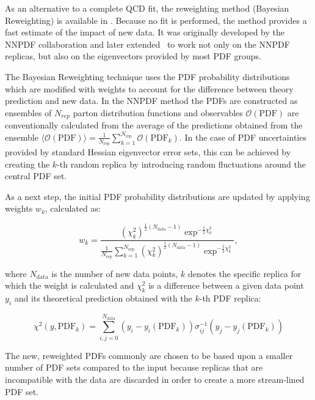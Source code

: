 As an alternative to a complete QCD fit, the reweighting method (Bayesian Reweighting) is available in \fitter.
Because no fit is performed, the method provides a fast estimate of the impact of new data. 
It was originally developed by the NNPDF collaboration \cite{Ball:2011gg,Ball:2010gb} and later extended~\cite{Watt:2012tq} 
to work not only on the NNPDF replicas, but also on the eigenvectors provided by most PDF groups. 

The Bayesian Reweighting technique uses the PDF probability distributions which are modified with weights 
to account for the difference between theory prediction and new data.
In the NNPDF method the PDFs are constructed as ensembles of $N_{rep}$ parton 
distribution functions and observables $\mathcal{O}(\mathrm{PDF})$ are conventionally calculated from the average
of the predictions obtained from the ensemble 
$\langle\mathcal{O}(\mathrm{PDF})\rangle =  \frac{1}{N_{\mathrm{rep}}} \sum_{k=1}^{N_{\mathrm{rep}}} \mathcal{O}(\mathrm{PDF}_k)$.
In the case of PDF uncertainties provided by standard Hessian eigenvector error sets, this can be achieved 
by creating the $k$-th random replica by introducing random fluctuations around the central PDF set.

As a next step, the initial PDF probability distributions are updated by applying weights 
$w_k$, calculated as:

\begin{equation}
 w_k = \frac{(\chi^2_k)^{\frac{1}{2} (N_{\mathrm{data}}-1) } \exp^{-\frac{1}{2}\chi^2_k}}{ \frac{1}{N_{\mathrm{rep}}} \sum^{N_{\mathrm{rep}}}_{k=1}(\chi^2_k)^{\frac{1}{2}(N_{\mathrm{data}}-1)} \exp^{-\frac{1}{2}\chi^2_k}  },
\end{equation}

where $N_{\mathrm{data}}$ is the number of new data points, $k$ denotes the specific replica for which the weight is calculated 
and $\chi^2_k$ is a difference between a given data point $y_i$ and its theoretical prediction obtained with the $k$-th PDF replica:

\begin{equation}
 \chi^2 (y,\mathrm{PDF}_k) = \sum_{i,j=0}^{N_{\mathrm{data}}} (y_i - y_i(\mathrm{PDF}_k)) \sigma^{-1}_{ij} (y_j-y_j(\mathrm{PDF}_k))  
\end{equation}

The new, reweighted PDFs commonly are chosen to be based upon a smaller number of PDF sets compared to the input because replicas 
that are incompatible with the data are discarded in order to create a more stream-lined PDF set.



